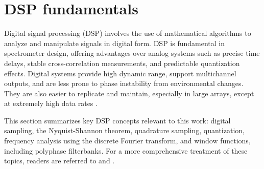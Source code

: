 \label{sec:frbs}

\section{DSP fundamentals}
Digital signal processing (DSP) involves the use of mathematical algorithms to analyze and manipulate signals in digital form. DSP is fundamental in spectrometer design, offering advantages over analog systems such as precise time delays, stable cross-correlation measurements, and predictable quantization effects. Digital systems provide high dynamic range, support multichannel outputs, and are less prone to phase instability from environmental changes. They are also easier to replicate and maintain, especially in large arrays, except at extremely high data rates \citep{thompson2017interferometry}. 


This section summarizes key DSP concepts relevant to this work: digital sampling, the Nyquist-Shannon theorem, quadrature sampling, quantization, frequency analysis using the discrete Fourier transform, and window functions, including polyphase filterbanks. For a more comprehensive treatment of these topics, readers are referred to \citet{Proakis1996digital} and \citet{Crockett2023}.

